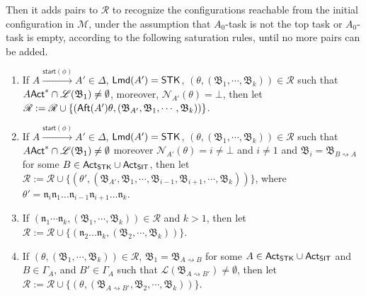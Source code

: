 \documentclass[preprint,12pt]{elsarticle}
\makeatletter
\newcommand\mathcircled[1]{%
  \mathpalette\@mathcircled{#1}%
}
\newcommand\@mathcircled[2]{%
  \tikz[baseline=(math.base)] \node[draw,circle,inner sep=0.2pt] (math) {$\m@th#1#2$};%
}
\newcommand\Mm{{\mathcal{M} }}
\newcommand\act{{\sf Act}}
\newcommand\aft{{\sf Aft}}
\newcommand\lmd{{\sf Lmd}}
\newcommand\startactivity{{\mathsf{start} }}
\newcommand\namefun{\mathcal{N}}
\newcommand\aname{\mathfrak{n}}
\newcommand\AutReach{\mathscr{R}}
\newcommand{\STK}{\mathsf{STK}}
\newcommand{\SIT}{\mathsf{SIT}}
\newcommand\AutB{{\mathfrak{B} }}
\newcommand\Lang{{\mathscr{L} }}
\makeatother
\begin{document}
{Then it adds pairs to $\AutReach$ to recognize the configurations reachable from the initial configuration in $\Mm$, under the assumption that $A_0$-task is not the top task or $A_0$-task is empty, according to the following saturation rules, until no more pairs can be added.

\smallskip
\fbox
{
\begin{minipage}{0.9\textwidth}
\begin{enumerate}
    \item If $A\xrightarrow{\startactivity(\phi)}A'\in\Delta$, $\lmd(A') = \STK$, 
    $(\theta, (\AutB_1,\cdots,\AutB_k)) \in \AutReach$ such that $A\act^*\cap\Lang(\AutB_1)\neq \emptyset$, moreover, $\namefun_{A'}(\theta) = \bot$, 
    then let $\AutReach:=\AutReach\cup\{(\aft(A')\theta, (\AutB_{A'},\AutB_1,\cdots,\AutB_k))\}$.
    \item If $A\xrightarrow{\startactivity(\phi)}A'\in\Delta$, $\lmd(A') = \STK$, $(\theta, (\AutB_1,\cdots,\AutB_k)) \in \AutReach$ such that $A\act^*\cap\Lang(\AutB_1)\neq \emptyset$ moreover $\namefun_{A'}(\theta) = i \neq\bot$ and $i\neq 1$ and $\AutB_i = \AutB_{B\rightsquigarrow A}$ for some $B\in\act_\STK\cup\act_\SIT$,
    then let $\AutReach:=\AutReach\cup\{(\theta', (\AutB_{A'},\AutB_1,\cdots,\AutB_{i-1},\AutB_{i+1},\cdots,\AutB_{k}))\}$, where $\theta' = \aname_i\aname_1\dots\aname_{i-1}\aname_{i+1}\dots\aname_k$.
    \item If $(\aname_1\cdots\aname_k, (\AutB_1,\cdots,\AutB_k)) \in \AutReach$ and $k>1$,
    then let $\AutReach:=\AutReach\cup\{(\aname_2\dots\aname_k, (\AutB_2,\cdots,\AutB_k))\}$.
    \item If $(\theta, (\AutB_1,\cdots,\AutB_k)) \in \AutReach$, $\AutB_1 = \AutB_{A\rightsquigarrow B}$ for some $A\in\act_{\STK}\cup\act_{\SIT}$ and $B \in \Gamma_A$, and $B'  \in \Gamma_A$ such that $\Lang(\AutB_{A\rightsquigarrow B'}) \neq \emptyset$, then let 
    $\AutReach := \AutReach \cup \{(\theta, (\AutB_{A\rightsquigarrow B'}, \AutB_2,\cdots,\AutB_k))\}$. 
\end{enumerate}
\end{minipage}
}
}

%

\end{document}
